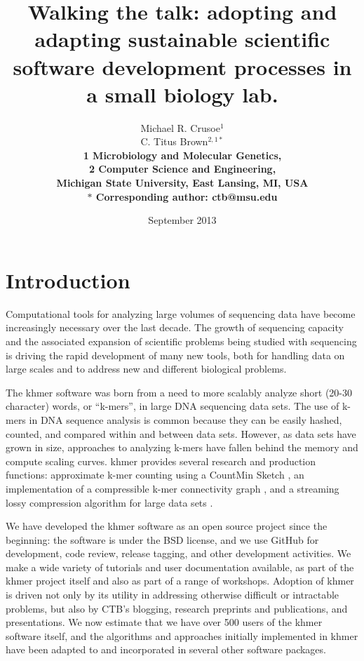 \documentclass[11pt]{article}
\date{September 2013}
\title{Walking the talk: adopting and adapting sustainable scientific software
  development processes in a small biology lab.}
\author{Michael R. Crusoe$^{1}$\\
C. Titus Brown$^{2,1\ast}$\\
\small \bf{1} Microbiology and Molecular Genetics,\\
\small \bf{2} Computer Science and Engineering,\\
\small Michigan State University, East Lansing, MI, USA\\
\small $\ast$ Corresponding author: ctb@msu.edu}
\begin{document}
\maketitle



\setlength{\parindent}{0pt}
\setlength{\parindent}{0pt}
\setlength{\parskip}{0.70ex}

\section{Introduction}

Computational tools for analyzing large volumes of sequencing data
have become increasingly necessary over the last decade.  The growth
of sequencing capacity and the associated expansion of scientific
problems being studied with sequencing is driving the rapid development of
many new tools, both for handling data on large scales and to address
new and different biological problems.

The khmer software was born from a need to more scalably analyze short
(20-30 character) words, or ``k-mers'', in large DNA sequencing data
sets. The use of k-mers in DNA sequence analysis is common because
they can be easily hashed, counted, and compared within and between
data sets.  However, as data sets have grown in size, approaches to
analyzing k-mers have fallen behind the memory and compute scaling
curves.  khmer provides several research and production functions:
approximate k-mer counting using a CountMin Sketch
\cite{Zhang2013}, an implementation of a compressible k-mer
connectivity graph \cite{Pell2012}, and a streaming lossy compression
algorithm for large data sets \cite{Brown2012}.

We have developed the khmer software as an open source project since
the beginning: the software is under the BSD license, and we use
GitHub for development, code review, release tagging, and other
development activities.  We make a wide variety of tutorials and
user documentation available, as part of the khmer project itself and
also as part of a range of workshops.  Adoption of khmer is driven not only by
its utility in addressing otherwise difficult or intractable problems,
but also by CTB's blogging, research preprints and publications, and
presentations.  We now estimate that we have over 500 users of the
khmer software itself, and the algorithms and approaches initially
implemented in khmer have been adapted to and incorporated in several other
software packages.
\end{document}
